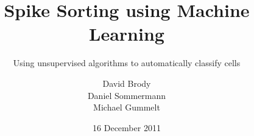 \documentclass{acm_proc_article-sp}
\begin{document}
\title{Spike Sorting using Machine Learning}
\subtitle{Using unsupervised algorithms to automatically classify cells}
%
%
%
%
%

%
\author{
%
%
\alignauthor
David Brody\\
\alignauthor Daniel Sommermann\\
\alignauthor
Michael Gummelt\\
}
\date{16 December 2011}
\end{document}
